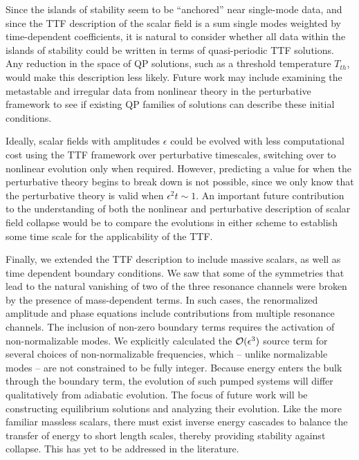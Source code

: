 \documentclass[../PhD.tex]{subfiles}
\begin{document}
Since the islands of stability seem to be ``anchored'' near single-mode data, and since the TTF description of the scalar field is a sum single modes weighted by time-dependent coefficients, it is natural to consider whether all data within the islands of stability could be written in terms of quasi-periodic TTF solutions. Any reduction in the space of QP solutions, such as a threshold temperature $T_{th}$, would make this description less likely. Future work may include examining the metastable and irregular data from nonlinear theory in the perturbative framework to see if existing QP families of solutions can describe these initial conditions. 

Ideally, scalar fields with amplitudes $\epsilon$ could be evolved with less computational cost using the TTF framework over perturbative timescales, switching over to nonlinear evolution only when required. However, predicting a value for when the perturbative theory begins to break down is not possible, since we only know that the perturbative theory is valid when $\epsilon^2 t \sim 1$. An important future contribution to the understanding of both the nonlinear and perturbative description of scalar field collapse would be to compare the evolutions in either scheme to establish some time scale for the applicability of the TTF. 

Finally, we extended the TTF description to include massive scalars, as well as time dependent boundary conditions. We saw that some of the symmetries that lead to the natural vanishing of two of the three resonance channels were broken by the presence of mass-dependent terms. In such cases, the renormalized amplitude and phase equations include contributions from multiple resonance channels. The inclusion of non-zero boundary terms requires the activation of non-normalizable modes. We explicitly calculated the $\mathcal O(\epsilon^3)$ source term for several choices of non-normalizable frequencies, which -- unlike normalizable modes -- are not constrained to be fully integer. Because energy enters the bulk through the boundary term, the evolution of such pumped systems will differ qualitatively from adiabatic evolution. The focus of future work will be constructing equilibrium solutions and analyzing their evolution. Like the more familiar massless scalars, there must exist inverse energy cascades to balance the transfer of energy to short length scales, thereby providing stability against collapse. This has yet to be addressed in the literature.
\end{document}

